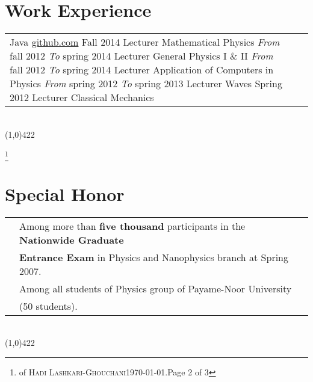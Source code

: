 \documentclass[10pt]{article}
\newcommand{\maxpages}{3}
\newcommand{\maxpages}{3}
\newcommand\HRule{\hspace*{.8cm}\line(1,0){422}\\}
\newenvironment{Record}[1]
{
    \vspace{-0.5cm}
    \section*{#1}
        \vspace{0.1cm}
        \begin{tabular}
}
{
        \end{tabular}\\
        \HRule
}
\newcommand{\FootNote}[1]{\let\thefootnote\relax\footnote{\smallsnellfont{\textbf{\textit{Curriculum Vitae}}} of \textsc{Hadi Lashkari-Ghouchani}\qquad\today.\qquad Page #1 of \maxpages}}
\begin{document}
\begin{Record}{Work Experience}{l l l}
        {Java}
        {\href{https://github.com/hadilq/java-persian-calendar}{github.com}}{}%
    \WorkExperience{\href{http://en.pnu.ac.ir/Portal/Home}{Payame-Noor University}}
        {Fall 2014}{}
        {Lecturer}
        {Mathematical Physics}
        {}{}{}{}%
    \WorkExperience{\href{http://www.sadjad.ac.ir/MainEn.aspx}{Sadjad University}}
        {\scriptsize\textit{From} fall 2012}
        {\scriptsize\textit{To} spring 2014}
        {Lecturer}
        {General Physics I \& II}
        {}{}{}{}%
    \WorkExperience{\href{http://en.pnu.ac.ir/Portal/Home}{Payame-Noor University}}
        {\scriptsize\textit{From} fall 2012}
        {\scriptsize\textit{To} spring 2014}
        {Lecturer}
        {Application of Computers in Physics}
        {}{}{}{}%
    \WorkExperience{\href{http://en.pnu.ac.ir/Portal/Home}{Payame-Noor University}}
        {\scriptsize\textit{From} spring 2012}
        {\scriptsize\textit{To} spring 2013}
        {Lecturer}
        {Waves}
        {}{}{}{}%
    \WorkExperience{\href{http://en.pnu.ac.ir/Portal/Home}{Payame-Noor University}}
        {Spring 2012}{}
        {Lecturer}
        {Classical Mechanics}
        {}{}{}{}%
\end{Record}


\FootNote{2}

\newcommand{\SpecialHonor}[3]{
    \textsl{ #1}&#2\\
    &#3\\
}
\begin{Record}{Special Honor}{l l}
    \SpecialHonor{\copperplatefont{\textbf{44th} rank}}
        {\scriptsize Among more than \textbf{five thousand} participants in the \textbf{Nationwide Graduate}}
        {\scriptsize \textbf{Entrance Exam} in Physics and Nanophysics branch at Spring 2007.}%
    \SpecialHonor{\copperplatefont{First rank}}
        {\scriptsize Among all students of Physics group of Payame-Noor University}
        {\scriptsize (50 students).}%
\end{Record}

\end{document}
